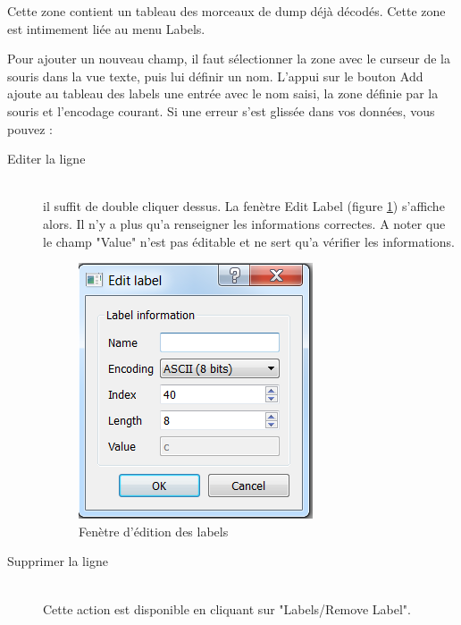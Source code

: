 Cette zone contient un tableau des morceaux de dump déjà décodés. Cette zone est intimement liée au menu Labels.

Pour ajouter un nouveau champ, il faut sélectionner la zone avec le curseur de la souris dans la vue texte, puis lui définir un nom. L'appui sur le bouton Add ajoute au tableau des labels une entrée avec le nom saisi, la zone définie par la souris et l'encodage courant.
Si une erreur s'est glissée dans vos données, vous pouvez :
\begin{description}
	\item[Editer la ligne] \hfill \\
	il suffit de double cliquer dessus. La fenètre Edit Label (figure \ref{editlabel}) s'affiche alors. Il n'y a plus qu'a renseigner les informations correctes. A noter que le champ "Value" n'est pas éditable et ne sert qu'a vérifier les informations.
	
	\begin{figure}[!h]
		\begin{center}
		\includegraphics[width=\textwidth]{Edit_label.png}
		\caption{Fenètre d'édition des labels}
		\label{editlabel}
		\end{center}
	\end{figure}
	
	\item[Supprimer la ligne] \hfill \\
	Cette action est disponible en cliquant sur "Labels/Remove Label".

\end{description}
 
